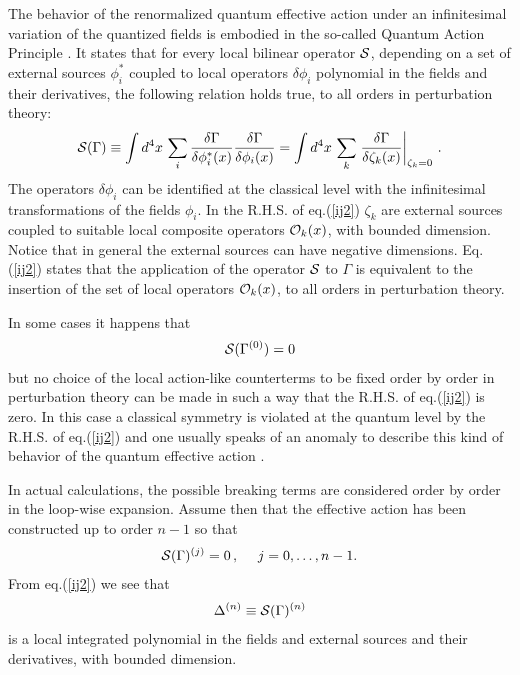 \documentclass[a4paper,11pt]{article}
\def\G{\Gamma}
\begin{document}
The behavior of the 
renormalized quantum effective action under an infinitesimal
variation of the quantized fields is 
embodied in the so-called Quantum Action Principle
\cite{QAP}.
It states  that for every local bilinear operator ${\cal S}$, depending
on a set of external sources 
$\phi^*_i$ coupled to local 
operators $\delta \phi_i$ polynomial in the fields and their
derivatives,
the following relation holds true, to all orders in perturbation theory:
%
\begin{eqnarray}
{\cal S}(\G) \equiv \int d^4x \, \sum_i 
{\delta \G \over \delta \phi^*_i(x)} {\delta \G \over \delta \phi_i(x)} = 
\int d^4x \, \sum_k \left . {\delta \G  \over \delta \zeta_k(x)} 
\right |_{\zeta_k=0} \, .
\label{ij2}
\end{eqnarray}
%
The operators $\delta \phi_i$ can be identified at the classical level
with the infinitesimal transformations of the 
fields $\phi_i$.
In the R.H.S. of eq.(\ref{ij2}) $\zeta_k$ are external sources
coupled to suitable local composite operators ${\cal O}_k(x)$,
with bounded dimension.
Notice  that in general the external sources can have negative 
dimensions.
Eq. (\ref{ij2}) states that the application of the operator ${\cal S}$
to $\G$ is equivalent to the insertion of the
 set of local
operators ${\cal O}_k(x)$, to all orders in perturbation theory.

In some cases it happens that
%
\begin{eqnarray}
{\cal S}(\G^{(0)})=0 
\label{ij3}
\end{eqnarray}
%
but no choice of the local action-like counterterms 
to be fixed order by order in perturbation theory can be made in such a way
that the R.H.S. of eq.(\ref{ij2}) is zero. In this case a classical
symmetry is violated at the quantum level by the R.H.S. of
eq.(\ref{ij2}) and one usually speaks of an anomaly to describe
this kind of behavior of the quantum effective action \cite{PS}.

In actual calculations, the possible breaking terms are considered order by order
in the loop-wise expansion.
Assume then that the effective action has been constructed up to order
$n-1$ so that
%
\begin{eqnarray}
{\cal S}(\G)^{(j)}=0 \, , ~~~~ j=0,\dots,n-1 .
\label{ij6}
\end{eqnarray}
%
From eq.(\ref{ij2}) we see that
%
\begin{eqnarray}
\Delta^{(n)} \equiv {\cal S}(\G)^{(n)}
\label{ij7}
\end{eqnarray}
%
is a local integrated polynomial in the fields and external sources
and their derivatives, with bounded dimension.
\end{document}
